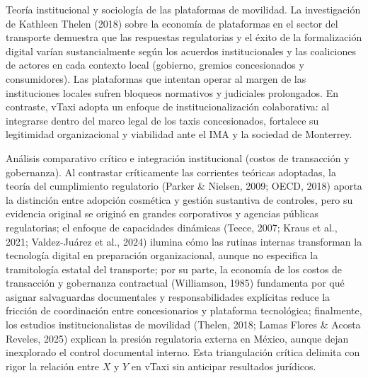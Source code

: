 {Teoría institucional y sociología de las plataformas de movilidad. La investigación de Kathleen Thelen (2018) sobre la economía de plataformas en el sector del transporte demuestra que las respuestas regulatorias y el éxito de la formalización digital varían sustancialmente según los acuerdos institucionales y las coaliciones de actores en cada contexto local (gobierno, gremios concesionados y consumidores). Las plataformas que intentan operar al margen de las instituciones locales sufren bloqueos normativos y judiciales prolongados. En contraste, vTaxi adopta un enfoque de institucionalización colaborativa: al integrarse dentro del marco legal de los taxis concesionados, fortalece su legitimidad organizacional y viabilidad ante el IMA y la sociedad de Monterrey.

Análisis comparativo crítico e integración institucional (costos de transacción y gobernanza). Al contrastar críticamente las corrientes teóricas adoptadas, la teoría del cumplimiento regulatorio (Parker \& Nielsen, 2009; OECD, 2018) aporta la distinción entre adopción cosmética y gestión sustantiva de controles, pero su evidencia original se originó en grandes corporativos y agencias públicas regulatorias; el enfoque de capacidades dinámicas (Teece, 2007; Kraus et al., 2021; Valdez-Juárez et al., 2024) ilumina cómo las rutinas internas transforman la tecnología digital en preparación organizacional, aunque no especifica la tramitología estatal del transporte; por su parte, la economía de los costos de transacción y gobernanza contractual (Williamson, 1985) fundamenta por qué asignar salvaguardas documentales y responsabilidades explícitas reduce la fricción de coordinación entre concesionarios y plataforma tecnológica; finalmente, los estudios institucionalistas de movilidad (Thelen, 2018; Lamas Flores \& Acosta Reveles, 2025) explican la presión regulatoria externa en México, aunque dejan inexplorado el control documental interno. Esta triangulación crítica delimita con rigor la relación entre $X$ y $Y$ en vTaxi sin anticipar resultados jurídicos.


}

